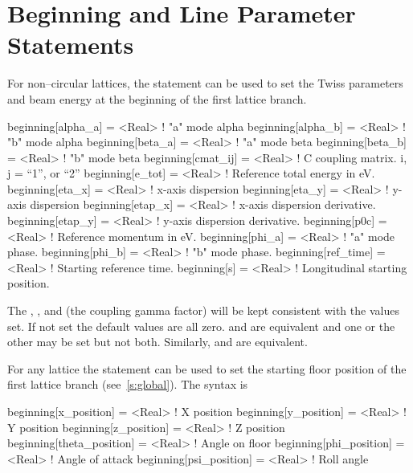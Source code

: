 \section{Beginning and Line Parameter Statements}
\label{s:beginning}

For non--circular lattices, the  statement can be used to
set the Twiss parameters and beam energy at the beginning of the first lattice branch.
\begin{example}
  beginning[alpha_a]  = <Real>  ! "a" mode alpha
  beginning[alpha_b]  = <Real>  ! "b" mode alpha
  beginning[beta_a]   = <Real>  ! "a" mode beta
  beginning[beta_b]   = <Real>  ! "b" mode beta
  beginning[cmat_ij]  = <Real>  ! C coupling matrix. i, j = {``1'', or ``2''} 
  beginning[e_tot]    = <Real>  ! Reference total energy in eV.
  beginning[eta_x]    = <Real>  ! x-axis dispersion
  beginning[eta_y]    = <Real>  ! y-axis dispersion
  beginning[etap_x]   = <Real>  ! x-axis dispersion derivative.
  beginning[etap_y]   = <Real>  ! y-axis dispersion derivative.
  beginning[p0c]      = <Real>  ! Reference momentum in eV.
  beginning[phi_a]    = <Real>  ! "a" mode phase.
  beginning[phi_b]    = <Real>  ! "b" mode phase.
  beginning[ref_time] = <Real>  ! Starting reference time.
  beginning[s]        = <Real>  ! Longitudinal starting position.
\end{example}
The , , and  (the coupling gamma
factor) will be kept consistent with the values set. If not set the
default values are all zero.   and
 are equivalent and one or the other may be
set but not both. Similarly,  and
 are equivalent.

For any lattice the  statement can be used to set the
starting floor position of the first lattice branch
(see~\ref{s:global}). The syntax is
\begin{example}
  beginning[x_position]     = <Real>  ! X position
  beginning[y_position]     = <Real>  ! Y position
  beginning[z_position]     = <Real>  ! Z position
  beginning[theta_position] = <Real>  ! Angle on floor
  beginning[phi_position]   = <Real>  ! Angle of attack
  beginning[psi_position]   = <Real>  ! Roll angle
\end{example}

